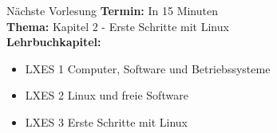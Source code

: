 \documentclass[aspectratio=43]{beamer}
\begin{document}

\begin{frame}[plain]
\begin{alertblock}{Nächste Vorlesung}
\textbf{Termin:} In 15 Minuten\\
\textbf{Thema:} Kapitel 2 - Erste Schritte mit Linux \\
\textbf{Lehrbuchkapitel:} 
\begin{itemize}
\item LXES 1 Computer, Software und Betriebssysteme
\item LXES 2 Linux und freie Software
\item LXES 3 Erste Schritte mit Linux
\end{itemize}
\end{alertblock}
\end{frame}

\materialframe
\versionframe
\end{document}
